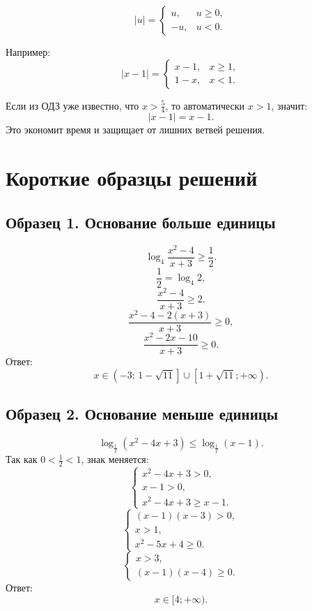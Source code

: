 \documentclass[a4paper,12pt]{article}
\begin{document}
\[
    |u|=
    \begin{cases}
    u, & u\ge 0,\\
    -u, & u<0.
    \end{cases}
\]

Например:
\[
    |x-1|=
    \begin{cases}
    x-1, & x\ge 1,\\
    1-x, & x<1.
    \end{cases}
\]

Если из ОДЗ уже известно, что \(x>\frac54\), то автоматически \(x>1\), значит:
\[
    |x-1|=x-1.
\]
Это экономит время и защищает от лишних ветвей решения.

\section{Короткие образцы решений}

\subsection*{Образец 1. Основание больше единицы}

\[
    \log_4\frac{x^2-4}{x+3}\ge \frac12.
\]
\[
    \frac12=\log_4 2,
\]
\[
    \frac{x^2-4}{x+3}\ge 2.
\]
\[
    \frac{x^2-4-2(x+3)}{x+3}\ge 0,
\]
\[
    \frac{x^2-2x-10}{x+3}\ge 0.
\]
Ответ:
\[
    x\in \left(-3;\,1-\sqrt{11}\right]\cup
    \left[1+\sqrt{11};+\infty\right).
\]

\subsection*{Образец 2. Основание меньше единицы}

\[
    \log_{\frac12}(x^2-4x+3)\le \log_{\frac12}(x-1).
\]
Так как \(0<\frac12<1\), знак меняется:
\[
    \begin{cases}
    x^2-4x+3>0,\\
    x-1>0,\\
    x^2-4x+3\ge x-1.
    \end{cases}
\]
\[
    \begin{cases}
    (x-1)(x-3)>0,\\
    x>1,\\
    x^2-5x+4\ge 0.
    \end{cases}
\]
\[
    \begin{cases}
    x>3,\\
    (x-1)(x-4)\ge 0.
    \end{cases}
\]
Ответ:
\[
    x\in [4;+\infty).
\]
\end{document}
